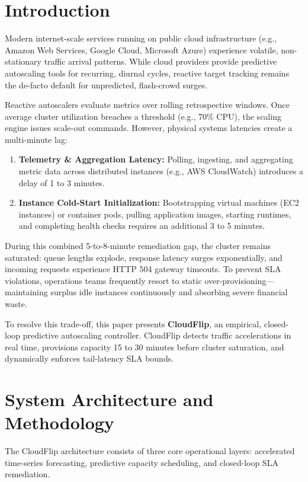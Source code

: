 \documentclass[conference]{IEEEtran}
\begin{document}
\section{Introduction}
Modern internet-scale services running on public cloud infrastructure (e.g., Amazon Web Services, Google Cloud, Microsoft Azure) experience volatile, non-stationary traffic arrival patterns. While cloud providers provide predictive autoscaling tools for recurring, diurnal cycles, reactive target tracking remains the de-facto default for unpredicted, flash-crowd surges.

Reactive autoscalers evaluate metrics over rolling retrospective windows. Once average cluster utilization breaches a threshold (e.g., 70\% CPU), the scaling engine issues scale-out commands. However, physical systems latencies create a multi-minute lag:
\begin{enumerate}
    \item \textbf{Telemetry & Aggregation Latency:} Polling, ingesting, and aggregating metric data across distributed instances (e.g., AWS CloudWatch) introduces a delay of 1 to 3 minutes.
    \item \textbf{Instance Cold-Start Initialization:} Bootstrapping virtual machines (EC2 instances) or container pods, pulling application images, starting runtimes, and completing health checks requires an additional 3 to 5 minutes.
\end{enumerate}

During this combined 5-to-8-minute remediation gap, the cluster remains saturated: queue lengths explode, response latency surges exponentially, and incoming requests experience HTTP 504 gateway timeouts. To prevent SLA violations, operations teams frequently resort to static over-provisioning—maintaining surplus idle instances continuously and absorbing severe financial waste.

To resolve this trade-off, this paper presents \textbf{CloudFlip}, an empirical, closed-loop predictive autoscaling controller. CloudFlip detects traffic accelerations in real time, provisions capacity 15 to 30 minutes before cluster saturation, and dynamically enforces tail-latency SLA bounds.

\section{System Architecture and Methodology}
The CloudFlip architecture consists of three core operational layers: accelerated time-series forecasting, predictive capacity scheduling, and closed-loop SLA remediation.
\end{document}
